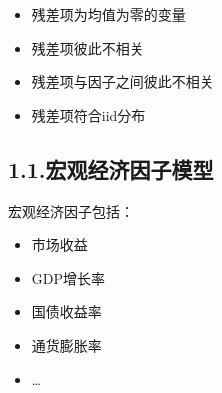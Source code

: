 \documentclass{article}
\begin{document}
\begin{itemize}[noitemsep,topsep=\mdcompacttopsep]%

\item{}残差项为均值为零的变量%

\item{}残差项彼此不相关%

\item{}残差项与因子之间彼此不相关%

\item{}残差项符合iid分布%
\end{itemize}%

\subsection{1.1.\hspace*{0.5em}宏观经济因子模型}\label{section}%

\noindent{}宏观经济因子包括：%

\begin{itemize}[noitemsep,topsep=\mdcompacttopsep]%

\item{}市场收益%

\item{}GDP增长率%

\item{}国债收益率%

\item{}通货膨胀率%

\item{}\dots{}%
\end{itemize}%
\end{document}
